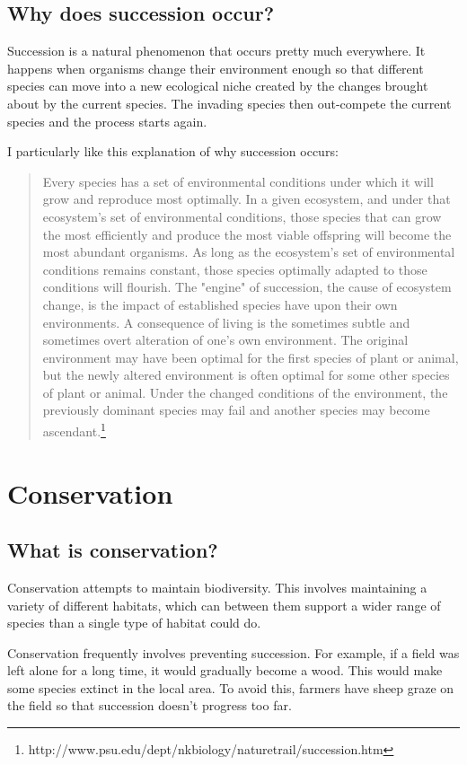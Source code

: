 \documentclass{article}
\begin{document}
\subsection*{Why does succession occur?}
Succession is a natural phenomenon that occurs pretty much everywhere. It happens when organisms change their environment enough so that different species can move into a new ecological niche created by the changes brought about by the current species. The invading species then out-compete the current species and the process starts again.

I particularly like this explanation of why succession occurs:

\begin{quotation}	
	Every species has a set of environmental conditions under which it will grow and reproduce most optimally. In a given ecosystem, and under that ecosystem's set of environmental conditions, those species that can grow the most efficiently and produce the most viable offspring will become the most abundant organisms. As long as the ecosystem's set of environmental conditions remains constant, those species optimally adapted to those conditions will flourish. The "engine" of succession, the cause of ecosystem change, is the impact of established species have upon their own environments. A consequence of living is the sometimes subtle and sometimes overt alteration of one's own environment. The original environment may have been optimal for the first species of plant or animal, but the newly altered environment is often optimal for some other species of plant or animal. Under the changed conditions of the environment, the previously dominant species may fail and another species may become ascendant.\footnote{http://www.psu.edu/dept/nkbiology/naturetrail/succession.htm}
\end{quotation}

\section*{Conservation}
\subsection*{What is conservation?}
Conservation attempts to maintain biodiversity. This involves maintaining a variety of different habitats, which can between them support a wider range of species than a single type of habitat could do.

Conservation frequently involves preventing succession. For example, if a field was left alone for a long time, it would gradually become a wood. This would make some species extinct in the local area. To avoid this, farmers have sheep graze on the field so that succession doesn't progress too far.
\end{document}
